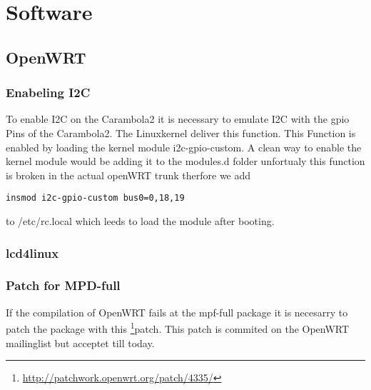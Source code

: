 \section{Software}
\subsection{OpenWRT}
\subsubsection{Enabeling I2C}
To enable I2C on the Carambola2 it is necessary to emulate I2C with the gpio Pins of the Carambola2. The Linuxkernel deliver this function. This Function is enabled by loading the kernel module i2c-gpio-custom. A clean way to enable the kernel module would be adding it to the modules.d folder unfortualy this function is broken in the actual openWRT trunk therfore we add 
\lstset{language = bash}
\begin{lstlisting}[]
insmod i2c-gpio-custom bus0=0,18,19
\end{lstlisting}
to /etc/rc.local which leeds to load the module after booting.
\subsubsection{lcd4linux}

\subsubsection{Patch for MPD-full}
If the compilation of OpenWRT fails at the mpf-full package it is necesarry to patch the package with this \footnote{\url{http://patchwork.openwrt.org/patch/4335/}}{patch}. This patch is commited on the OpenWRT mailinglist but acceptet till today.
%

